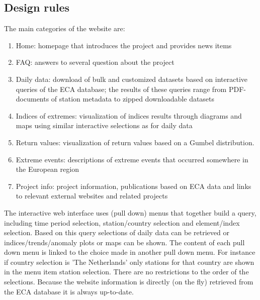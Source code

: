 \documentclass[a4paper,11pt]{article}
\begin{document}
\subsection{Design rules}
\label{sec:websiterules}

The main categories of the website are:
\begin{enumerate}
\item Home: homepage that introduces the project and provides news items
\item FAQ: answers to several question about the project
\item Daily data: download of bulk and customized datasets based on
      interactive queries of the ECA database; the results of these
      queries range from PDF-documents of station metadata to zipped
      downloadable datasets
\item Indices of extremes: visualization of indices results through
      diagrams and maps using similar interactive selections as for
      daily data
\item Return values: visualization of return values based on a Gumbel
      distribution.
\item Extreme events: descriptions of extreme events that occurred
      somewhere in the European region
\item Project info: project information, publications based on ECA
      data and links to relevant external websites and related
      projects
\end{enumerate}
The interactive web interface uses (pull down) menus that together
build a query, including time period selection, station/country
selection and element/index selection. Based on this query selections
of daily data can be retrieved or indices/trends/anomaly plots or maps
can be shown. The content of each pull down menu is linked to the
choice made in another pull down menu. For instance if country
selection is 'The Netherlands' only stations for that country are
shown in the menu item station selection. There are no restrictions to
the order of the selections. Because the website information is
directly (on the fly) retrieved from the ECA database it is always
up-to-date.

\newpage


\end{document}
